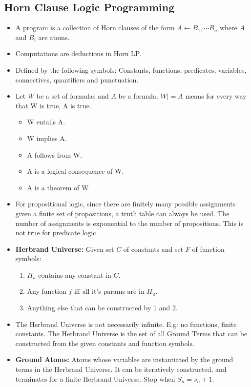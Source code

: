 \documentclass[landscape, letterpaper]{extarticle}
\theoremstyle{definition}
\begin{document}
\begin{multicols}{3}
    \section*{Horn Clause Logic Programming}
    \begin{itemize}[noitemsep,nolistsep]
        \item A program is a collection of Horn clauses of the form \(A \leftarrow B_1, \cdots B_n\) where \(A\) and \(B_i\) are atoms.
        \item Computations are deductions in Horn LP.
        \item Defined by the following symbols: Constants, functions, predicates, variables, connectives, quantifiers and punctuation.
        \item Let \(W\) be a set of formulas and \(A\) be a formula. \(W |= A\) means for every way that W is true, A is true.
        \begin{itemize}[noitemsep,nolistsep]
            \item W entails A.
            \item W implies A.
            \item A follows from W.
            \item A is a logical consequence of W.
            \item A is a theorem of W
        \end{itemize}
        \item For propositional logic, since there are finitely many possible assignments given a finite set of propositions, a truth table can always be used. The number of assignments is exponential to the number of propositions. This is not true for predicate logic.
        \item \textbf{Herbrand Universe:} Given set \(C\) of constants and set \(F\) of function symbols:
        \begin{enumerate}
            \item \(H_u\) contains any constant in \(C\).
            \item Any function \(f\) iff all it's params are in \(H_u\).
            \item Anything else that can be constructed by 1 and 2.
        \end{enumerate}
        \item The Herbrand Universe is not necessarily infinite. E.g: no functions, finite constants. The Herbrand Universe is the set of all Ground Terms that can be constructed from the given constants and function symbols.
        \item \textbf{Ground Atoms:} Atoms whose variables are instantiated by the ground terms in the Herbrand Universe. It can be iteratively constructed, and terminates for a finite Herbrand Universe. Stop when \(S_n = s_n + 1\).
    \end{itemize}

\end{multicols}
\end{document}
